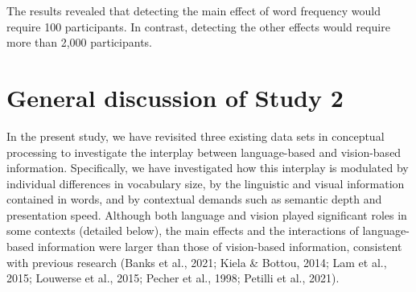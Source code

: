 \documentclass[
  12pt,
  man,floatsintext]{apa7}
\begin{document}
The results revealed that detecting the main effect of word frequency would require 100 participants. In contrast, detecting the other effects would require more than 2,000 participants.

\hypertarget{general-discussion-of-study-2}{%
\section{General discussion of Study 2}\label{general-discussion-of-study-2}}

In the present study, we have revisited three existing data sets in conceptual processing to investigate the interplay between language-based and vision-based information. Specifically, we have investigated how this interplay is modulated by individual differences in vocabulary size, by the linguistic and visual information contained in words, and by contextual demands such as semantic depth and presentation speed. Although both language and vision played significant roles in some contexts (detailed below), the main effects and the interactions of language-based information were larger than those of vision-based information, consistent with previous research (Banks et al., 2021; Kiela \& Bottou, 2014; Lam et al., 2015; Louwerse et al., 2015; Pecher et al., 1998; Petilli et al., 2021).
\end{document}
